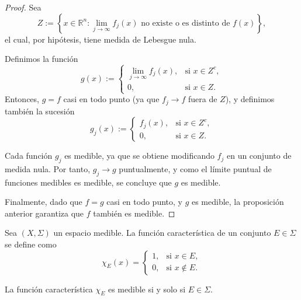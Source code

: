 \begin{proof}
    Sea
    \[
        Z := \left\{x \in \mathbb{R}^n : \lim_{j \to \infty} f_j(x) \text{ no existe o es distinto de } f(x) \right\},
    \]
    el cual, por hipótesis, tiene medida de Lebesgue nula.

    Definimos la función
    \[
        g(x) :=
        \begin{cases}
            \lim_{j \to \infty} f_j(x), & \text{si } x \in Z^c, \\
            0,                          & \text{si } x \in Z.
        \end{cases}
    \]
    Entonces, $g = f$ casi en todo punto (ya que $f_j \to f$ fuera de $Z$), y
    definimos también la sucesión
    \[
        g_j(x) :=
        \begin{cases}
            f_j(x), & \text{si } x \in Z^c, \\
            0,      & \text{si } x \in Z.
        \end{cases}
    \]

    Cada función $g_j$ es medible, ya que se obtiene modificando $f_j$ en un
    conjunto de medida nula. Por tanto, $g_j \to g$ puntualmente, y como el límite
    puntual de funciones medibles es medible, se concluye que $g$ es medible.

    Finalmente, dado que $f = g$ casi en todo punto, y $g$ es medible, la
    proposición anterior garantiza que $f$ también es medible.
\end{proof}

\begin{definición}\label{def:FuncionCaracteristica}
Sea $(X, \Sigma)$ un espacio medible. La función característica de un conjunto $E \in \Sigma$ se define como
\[
    \chi_E(x) =
    \begin{cases}
        1, & \text{si } x \in E,    \\
        0, & \text{si } x \notin E.
    \end{cases}
\]
\end{definición}

\begin{observación}
La función característica $\chi_E$ es medible si y solo si $E \in \Sigma$.
\end{observación}

